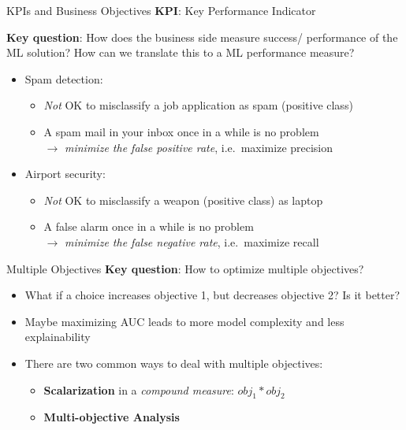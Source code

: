 \documentclass[ignorenonframetext,]{beamer}
\providecommand{\tightlist}{%
  \setlength{\itemsep}{0pt}\setlength{\parskip}{0pt}}
\begin{document}
\begin{frame}{KPIs and Business Objectives}
\label{translating-kpis-into-performance-measures}
\textbf{KPI}: Key Performance Indicator

\textbf{Key question}: How does the business side measure success/ performance of the ML solution? How can we translate this to a ML performance measure?

\begin{itemize}
\tightlist
\item
  Spam detection:

\begin{itemize}
  \tightlist
  \item
    \emph{Not} OK to misclassify a job application as spam (positive
    class)
  \item
    A spam mail in your inbox once in a while is no problem\\
    \(\rightarrow\) \emph{minimize the false positive rate},
    i.e.~maximize precision
  \end{itemize}
\item
  Airport security:

  \begin{itemize}
  \tightlist
  \item
    \emph{Not} OK to misclassify a weapon (positive class) as laptop
  \item
    A false alarm once in a while is no problem\\
    \(\rightarrow\) \emph{minimize the false negative rate},
    i.e.~maximize recall
  \end{itemize}
\end{itemize}

\end{frame}

\begin{frame}{Multiple Objectives}
\label{multiple-objectives}
\textbf{Key question}: How to optimize multiple objectives?
\begin{itemize}
\tightlist
\item
  What if a choice increases objective 1, but decreases objective 2? Is
  it better?
\item Maybe maximizing AUC leads to more model complexity and less explainability
\item
  There are two common ways to deal with multiple objectives:

  \begin{itemize}
  \tightlist
  \item
    \textbf{Scalarization} in a \emph{compound measure}:
    \(obj_1 * obj_2\)
  \item
    \textbf{Multi-objective Analysis} %
  \end{itemize}
\end{itemize}
\end{frame}
\end{document}
